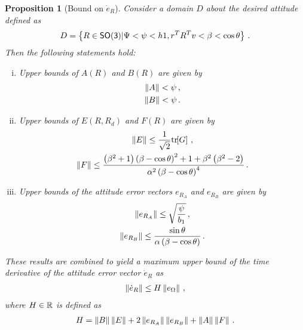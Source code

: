 \documentclass[letterpaper, 10 pt, conference]{ieeeconf}  %
\newtheorem{prop}{Proposition}
\begin{document}
\begin{prop}[Bound on \( \dot{e}_R \)]\label{prop:eR_dot_bound}
Consider a domain \( D \) about the desired attitude defined as
\begin{align}
	D = \left\{ R \in \mathsf{SO(3)} \vert \Psi < \psi < h1, r^T R^T v < \beta < \cos \theta \right\} \, . \label{eqn:domain}
\end{align}
Then the following statements hold:
\begin{enumerate}[(i)]
	\item \label{item:prop_eR_dot_bound_AB} Upper bounds of \( A(R) \) and \( B(R) \) are given by
	\begin{gather}
		\left\| A \right\| < \psi \, , \label{eqn:A_bound}\\
		\left\| B \right\| < \psi \, . \label{eqn:B_bound}
	\end{gather}
	\item \label{item:prop_eR_dot_bound_EF} Upper bounds of \( E(R,R_d) \) and \( F(R) \) are given by
	\begin{gather}
		\left\| E \right\| \leq \frac{1}{\sqrt{2}} \mathrm{tr}\negthickspace\left[ G \right] \, , \label{eqn:E_bound} \\
		\left\| F \right\| \leq \frac{\left( \beta^2 + 1 \right)\left( \beta - \cos \theta \right)^2 + 1 + \beta^2 \left( \beta^2-2 \right)}{\alpha^2 \left( \beta-\cos \theta \right)^4} \, . \label{eqn:F_bound}
	\end{gather}
	\item Upper bounds of the attitude error vectors \( e_{R_A} \) and \( e_{R_B} \) are given by
	\begin{gather}
		\left\| e_{R_A} \right\| \leq \sqrt{\frac{\psi}{b_1}} \, , \label{eqn:eRA_bound} \\
		\left\| e_{R_B} \right\| \leq \frac{\sin\theta}{\alpha \left( \beta - \cos \theta \right)} \, . \label{eqn:eRB_bound}
	\end{gather}
\end{enumerate}
These results are combined to yield a maximum upper bound of the time derivative of the attitude error vector \( \dot{e}_R \) as
\begin{gather}
	\left\| \dot{e}_R \right\| \leq H \left\| e_\Omega \right\| \, ,\label{eqn:eR_bound}
\end{gather}
where  \( H \in \mathbb{R} \) is defined as
\begin{gather}
	H = \left\| B \right\| \left\| E \right\| + 2 \left\| e_{R_A} \right\| \left\| e_{R_B} \right\| + \left\| A \right\|\left\| F \right\|\, . \label{eqn:H}
\end{gather}
\end{prop}
\end{document}
